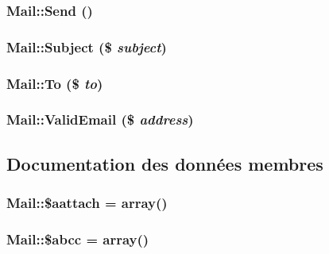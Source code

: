 \hypertarget{classMail_a14}{
\subsubsection[Send]{\setlength{\rightskip}{0pt plus 5cm}Mail::Send ()}}
\label{classMail_a14}


\hypertarget{classMail_a2}{
\subsubsection[Subject]{\setlength{\rightskip}{0pt plus 5cm}Mail::Subject (\$ {\em subject})}}
\label{classMail_a2}


\hypertarget{classMail_a6}{
\subsubsection[To]{\setlength{\rightskip}{0pt plus 5cm}Mail::To (\$ {\em to})}}
\label{classMail_a6}


\hypertarget{classMail_a16}{
\subsubsection[ValidEmail]{\setlength{\rightskip}{0pt plus 5cm}Mail::Valid\-Email (\$ {\em address})}}
\label{classMail_a16}




\subsection{Documentation des donn\'{e}es membres}
\hypertarget{classMail_o3}{
\subsubsection[\$aattach]{\setlength{\rightskip}{0pt plus 5cm}Mail::\$aattach = array()}}
\label{classMail_o3}


\hypertarget{classMail_o2}{
\subsubsection[\$abcc]{\setlength{\rightskip}{0pt plus 5cm}Mail::\$abcc = array()}}
\label{classMail_o2}


